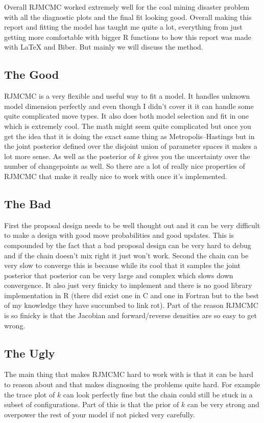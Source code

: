 \documentclass[10pt]{article}
\begin{document}
Overall RJMCMC worked extremely well for the coal mining disaster problem with all the diagnostic plots and the final fit looking good. Overall making this report and fitting the model has taught me quite a lot, everything from just getting more comfortable with bigger R functions to how this report was made with LaTeX and Biber. But mainly we will discuss the method.

\subsection{The Good}
RJMCMC is a very flexible and useful way to fit a model. It handles unknown model dimension perfectly and even though I didn't cover it it can handle some quite complicated move types. It also does both model selection and fit in one which is extremely cool. The math might seem quite complicated but once you get the idea that it is doing the exact same thing as Metropolis–Hastings but in the joint posterior defined over the disjoint union of parameter spaces it makes a lot more sense. As well as the posterior of \(k\) gives you the uncertainty over the number of changepoints as well. So there are a lot of really nice properties of RJMCMC that make it really nice to work with once it's implemented.
\subsection{The Bad}
First the proposal design needs to be well thought out and it can be very difficult to make a design with good move probabilities and good updates. This is compounded by the fact that a bad proposal design can be very hard to debug and if the chain doesn't mix right it just won't work. Second the chain can be very slow to converge this is because while its cool that it samples the joint posterior that posterior can be very large and complex which slows down convergence. It also just very finicky to implement and there is no good library implementation in R (there did exist one in C and one in Fortran but to the best of my knowledge they have succumbed to link rot). Part of the reason RJMCMC is so finicky is that the Jacobian and forward/reverse densities are so easy to get wrong.
\subsection{The Ugly}
The main thing that makes RJMCMC hard to work with is that it can be hard to reason about and that makes diagnosing the problems quite hard. For example the trace plot of \(k\) can look perfectly fine but the chain could still be stuck in a subset of configurations. Part of this is that the prior of \(k\) can be very strong and overpower the rest of your model if not picked very carefully.
\end{document}
